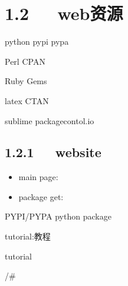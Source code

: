 \documentclass[letterpaper,12pt,english]{sphinxmanual}
\begin{document}
\begin{DUlineblock}{0em}
\item[] 
\item[] 
\item[] 
\end{DUlineblock}


\section{1.2   web资源}
\label{\detokenize{001software/001install/python:web}}
\begin{DUlineblock}{0em}
\item[] python \sphinxhyphen{} pypi pypa
\item[] Perl \sphinxhyphen{} CPAN
\item[] Ruby \sphinxhyphen{} Gems
\end{DUlineblock}

\begin{DUlineblock}{0em}
\item[] latex \sphinxhyphen{} CTAN
\item[] sublime \sphinxhyphen{} packagecontol.io
\end{DUlineblock}


\subsection{1.2.1   website}
\label{\detokenize{001software/001install/python:website}}\begin{itemize}
\item {} 
main page:


\item {} 
package get:

\end{itemize}

\begin{DUlineblock}{0em}
\item[] PYPI/PYPA python package
\item[] 
\item[] 
\item[] \sphinxhyphen{} tutorial:教程 
\item[] tutorial
\item[] 
\item[] /\#
\end{DUlineblock}
\end{document}
